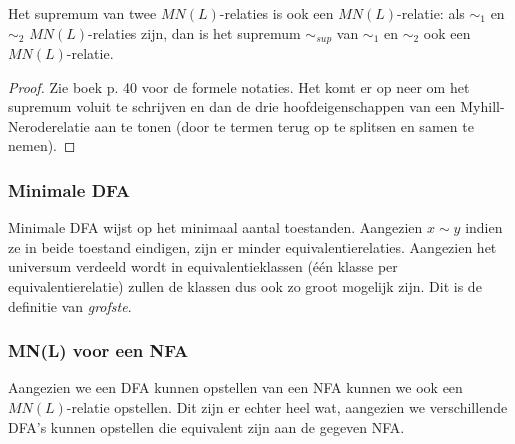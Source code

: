 \begin{theorem}
  Het supremum van twee $MN(L)$-relaties is ook een $MN(L)$-relatie: als $\sim_1$ en $\sim_2$ $MN(L)$-relaties zijn, dan is het supremum $\sim_{sup}$ van $\sim_1$ en $\sim_2$ ook een $MN(L)$-relatie.
\end{theorem}

\begin{proof}
  Zie boek p. 40 voor de formele notaties. Het komt er op neer om het supremum voluit te schrijven en dan de drie hoofdeigenschappen van een Myhill-Neroderelatie aan te tonen (door te termen terug op te splitsen en samen te nemen).
\end{proof}

\subsubsection*{Minimale DFA}

Minimale DFA wijst op het minimaal aantal toestanden. Aangezien $x \sim y$ indien ze in beide toestand eindigen, zijn er minder equivalentierelaties. Aangezien het universum verdeeld wordt in equivalentieklassen (\'e\'en klasse per equivalentierelatie) zullen de klassen dus ook zo groot mogelijk zijn. Dit is de definitie van \emph{grofste}.

\subsubsection*{MN(L) voor een NFA}

Aangezien we een DFA kunnen opstellen van een NFA kunnen we ook een $MN(L)$-relatie opstellen. Dit zijn er echter heel wat, aangezien we verschillende DFA's kunnen opstellen die equivalent zijn aan de gegeven NFA.
